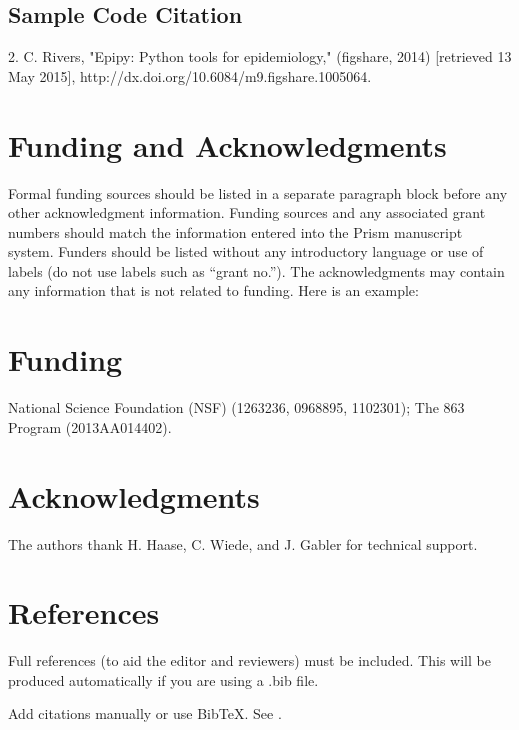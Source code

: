 \documentclass[9pt,twocolumn,twoside]{osajnl}
\begin{document}
\subsection{Sample Code Citation}

2. C. Rivers, "Epipy: Python tools for epidemiology," (figshare, 2014) [retrieved 13 May 2015], http://dx.doi.org/10.6084/m9.figshare.1005064.

\section{Funding and Acknowledgments}

Formal funding sources should be listed in a separate paragraph block before any other acknowledgment information. Funding sources and any associated grant numbers should match the information entered into the Prism manuscript system. Funders should be listed without any introductory language or use of labels (do not use labels such as “grant no.”). The acknowledgments may contain any information that is not related to funding. Here is an example:

\section*{Funding}National Science Foundation (NSF) (1263236, 0968895, 1102301); The 863 Program (2013AA014402).


\section*{Acknowledgments}The authors thank H. Haase, C. Wiede, and J. Gabler for technical support.

\section{References}

Full references (to aid the editor and reviewers) must be included. This will be produced automatically if you are using a .bib file.

\bigskip
\noindent Add citations manually or use BibTeX. See \cite{Chitimalla:17,Wen:16}.

% 

\end{document}
